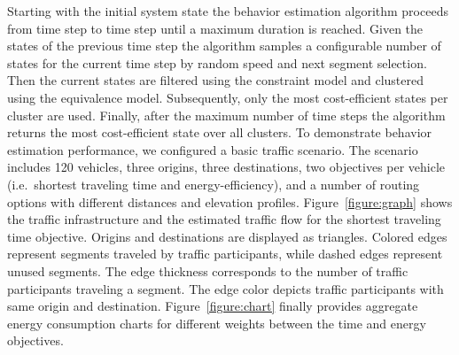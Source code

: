 \documentclass[conference]{../cls/IEEEtran}
\begin{document}
Starting with the initial system state the behavior estimation algorithm
proceeds from time step to time step until a maximum duration is reached. Given
the states of the previous time step the algorithm samples a configurable number of states for the current time step by random speed and next segment selection. Then the current states are filtered using the constraint model and clustered using the equivalence model. Subsequently, only the most cost-efficient states per cluster are used. Finally, after the maximum number of time steps the algorithm returns the most cost-efficient state over all clusters. To demonstrate behavior estimation performance, we configured a basic traffic scenario. The scenario includes 120 vehicles, three origins, three destinations, two objectives per vehicle (i.e.\ shortest traveling time and energy-efficiency), and a number of routing options with different distances and elevation profiles. Figure~\ref{figure:graph} shows the traffic infrastructure and the estimated traffic flow for the shortest traveling time objective. Origins and destinations are displayed as triangles. Colored edges represent segments traveled by traffic participants, while dashed edges represent unused segments. The edge thickness corresponds to the number of traffic participants traveling a segment. The edge color depicts traffic participants with same origin and destination. Figure~\ref{figure:chart} finally provides aggregate energy consumption charts for different weights between the time and energy objectives.

\end{document}
